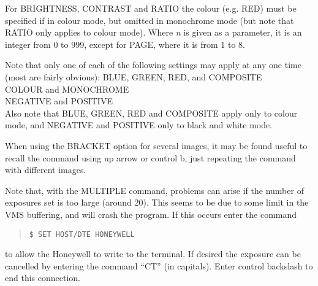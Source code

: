 For BRIGHTNESS, CONTRAST and RATIO the colour (e.g. RED) must be 
specified if in colour mode, but omitted in monochrome mode (but note
that RATIO only applies to colour mode). Where {\em n} is given as a
parameter, it is an integer from 0 to 999, except for PAGE, where it is
from 1 to 8.

Note that only one of each of the following settings may apply at
any one time (most are fairly obvious):
BLUE, GREEN, RED, and COMPOSITE\\
COLOUR and MONOCHROME\\
NEGATIVE and POSITIVE\\
Also note that BLUE, GREEN, RED and COMPOSITE apply only to colour
mode, and NEGATIVE and POSITIVE only to black and white mode.

When using the BRACKET option for several images, it may be found
useful to recall the command using up arrow or control b, just
repeating the command with different images.

Note that, with the MULTIPLE command, problems can arise if the number
of exposures set is too large (around 20). This seems to be due to some
limit in the VMS buffering, and will crash the program. If this occurs
enter the command
\begin{quote}
\begin{verbatim}
$ SET HOST/DTE HONEYWELL
\end{verbatim}
\end{quote}
to allow the Honeywell to write to the terminal. If desired the exposure
can be cancelled by entering the command ``CT'' (in capitals). Enter
control backslash to end this connection.


